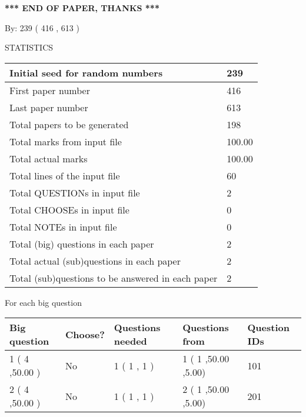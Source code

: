 \documentclass[12pt]{article}
\begin{document}
\vspace{1.0in} 
{\textbf{\large{ *** END OF PAPER, THANKS *** }}} 
   
   
\hspace{1.0in} By: 
 239 ( 416 ,  613 )
   
   
   
\vspace{0.2in}
\vspace{0.2in}
   
   
 \newpage
\setcounter{page}{1} 
   
   
 {\LARGE{STATISTICS}}
   
\vspace{0.2in}
   
 \begin{tabular}{|l|l|}
 \hline
 Initial seed for random numbers & 239  \\
\hline
 First paper number & 416  \\
\hline
 Last  paper number & 613  \\
\hline
 Total papers to be generated & 198  \\
\hline
Total marks from input file & 100.00 \\
\hline
Total actual marks & 100.00 \\
\hline
 Total lines of the input file & 60  \\
 \hline
 Total QUESTIONs in input file & 2  \\
\hline
 Total CHOOSEs in input file & 0  \\
\hline
 Total NOTEs in input file & 0  \\
\hline
 Total (big) questions in each paper & 2  \\
\hline
 Total actual (sub)questions in each paper & 2  \\
\hline
 Total (sub)questions to be answered in each paper & 2  \\
\hline
 \end{tabular}
   
   
 \newpage
   
{\LARGE{For each big question}}
   
   
\vspace{0.2in}
   
   
\noindent\hspace{-0.4in}\begin{tabular}{|l|l|l|l|l|}
\hline
 Big question & Choose? & Questions needed & Questions from & Question IDs \\ 
\hline
 1 ( 4 ,50.00
 ) &  No   & 
 1 ( 1 ,  1 ) &  1 ( 1
,50.00
 ,5.00) &  101  \\
 \hline
 2 ( 4 ,50.00
 ) &  No   & 
 1 ( 1 ,  1 ) &  2 ( 1
,50.00
 ,5.00) &  201  \\
 \hline
 \end{tabular}
 
 
\end{document}
